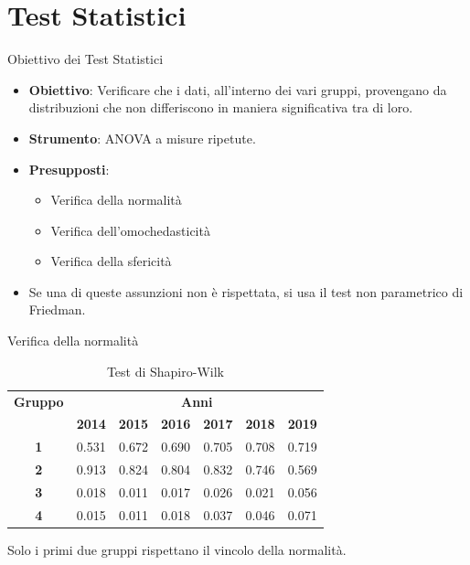 \documentclass{beamer}
\begin{document}
\section{Test Statistici} %
  
\begin{frame}{Obiettivo dei Test Statistici}
	\begin{itemize}
	  \item \textbf{Obiettivo}: Verificare che i dati, all'interno dei vari gruppi,
	  provengano da distribuzioni che non differiscono
	  in maniera significativa tra di loro.
	  \item \textbf{Strumento}: ANOVA a misure ripetute.
	  \item \textbf{Presupposti}:
		\begin{itemize}
		  \item Verifica della normalità
		  \item Verifica dell'omochedasticità
		  \item Verifica della sfericità
		  \end{itemize}
	  \item Se una di queste assunzioni non è rispettata, si usa il test non parametrico di Friedman.
	\end{itemize}
  \end{frame}


\begin{frame}{Verifica della normalità}
	\begin{table}[htbp]
		\captionsetup{labelformat=empty} %
		\caption{Test di Shapiro-Wilk}
		\begin{center}
		\begin{tabular}{|c|c|c|c|c|c|c|}
		\hline
		\textbf{Gruppo}&\multicolumn{6}{|c|}{\textbf{Anni}} \\
		\cline{2-7} 
		 & \textbf{2014} & \textbf{2015} & \textbf{2016} & \textbf{2017} & \textbf{2018} & \textbf{2019}\\
		\hline
		\textbf{1} & 0.531 & 0.672 & 0.690 & 0.705 & 0.708 & 0.719 \\\cline{1-7}
		\textbf{2} & 0.913 & 0.824 & 0.804 & 0.832 & 0.746 & 0.569 \\\cline{1-7}
		\textbf{3} & 0.018 & 0.011 & 0.017 & 0.026 & 0.021 & 0.056 \\\cline{1-7}
		\textbf{4} & 0.015 & 0.011 & 0.018 & 0.037 & 0.046 & 0.071 \\\cline{1-7}
		\hline
		\end{tabular}
		\end{center}
	\end{table}
	Solo i primi due gruppi rispettano il vincolo della normalità.
\end{frame}
\end{document}
